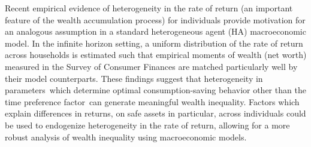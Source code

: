 Recent empirical evidence of heterogeneity in the rate of return (an important feature of the wealth accumulation process) for individuals provide motivation for an analogous assumption in a standard heterogeneous agent (HA) macroeconomic model. In the infinite horizon setting, a uniform distribution of the rate of return across households is estimated such that empirical moments of wealth (net worth) measured in the Survey of Consumer Finances are matched particularly well by their model counterparts. These findings suggest that heterogeneity in parameters which determine optimal consumption-saving behavior other than the time preference factor can generate meaningful wealth inequality. Factors which explain differences in returns, on safe assets in particular, across individuals could be used to endogenize heterogeneity in the rate of return, allowing for a more robust analysis of wealth inequality using macroeconomic models. 